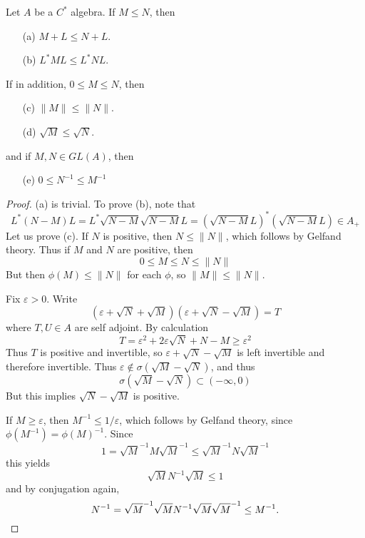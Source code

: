\begin{prop}
    Let $A$ be a $C^*$ algebra. If $M \leq N$, then
    \begin{enumerate}
        \item[(a)] $M + L \leq N + L$.
        \item[(b)] $L^*ML \leq L^*NL$.
    \end{enumerate}
    If in addition, $0 \leq M \leq N$, then
    \begin{enumerate}
        \item[(c)] $\| M \| \leq \| N \|$.
        \item[(d)] $\sqrt{M} \leq \sqrt{N}$.
    \end{enumerate}
    and if $M, N \in GL(A)$, then
    \begin{enumerate}
        \item[(e)] $0 \leq N^{-1} \leq M^{-1}$
    \end{enumerate}
\end{prop}
\begin{proof}
    (a) is trivial. To prove (b), note that
    \[ L^*(N - M)L = L^*\sqrt{N - M}\sqrt{N - M}L = (\sqrt{N - M} L)^* (\sqrt{N - M} L) \in A_+ \]
    Let us prove (c). If $N$ is positive, then $N \leq \| N \|$, which follows by Gelfand theory. Thus if $M$ and $N$ are positive, then
    \[ 0 \leq M \leq N \leq \| N \| \]
    But then $\phi(M) \leq \| N \|$ for each $\phi$, so $\| M \| \leq \| N \|$.

    Fix $\varepsilon > 0$. Write
    \[ (\varepsilon + \sqrt{N} + \sqrt{M})(\varepsilon + \sqrt{N} - \sqrt{M}) = T \]
    where $T,U \in A$ are self adjoint. By calculation
    \[ T = \varepsilon^2 + 2 \varepsilon \sqrt{N} + N - M \geq \varepsilon^2 \]
    Thus $T$ is positive and invertible, so $\varepsilon + \sqrt{N} - \sqrt{M}$ is left invertible and therefore invertible. Thus $\varepsilon \not \in \sigma(\sqrt{M} - \sqrt{N})$, and thus
    \[ \sigma(\sqrt{M} - \sqrt{N}) \subset (-\infty, 0) \]
    But this implies $\sqrt{N} - \sqrt{M}$ is positive.

    If $M \geq \varepsilon$, then $M^{-1} \leq 1/\varepsilon$, which follows by Gelfand theory, since $\phi(M^{-1}) = \phi(M)^{-1}$. Since
    \[ 1 = \sqrt{M}^{-1}M\sqrt{M}^{-1} \leq \sqrt{M}^{-1} N \sqrt{M}^{-1} \]
    this yields
    \[ \sqrt{M} N^{-1} \sqrt{M} \leq 1 \]
    and by conjugation again,
    \[ N^{-1} = \sqrt{M}^{-1} \sqrt{M} N^{-1} \sqrt{M} \sqrt{M}^{-1} \leq M^{-1}. \qedhere \]
\end{proof}

